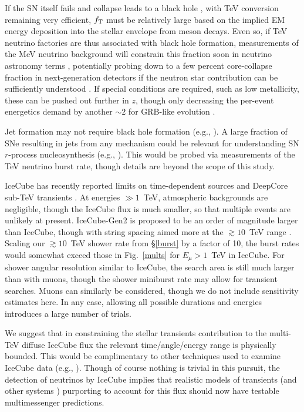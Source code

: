\documentclass[aps,prd,nofootinbib,twocolumn,floatfix,letterpaper,superscriptaddress,showpacs]{revtex4}
\begin{document}
If the SN itself fails and collapse leads to a black hole \cite{Kochanek:2008mp}, with TeV conversion remaining very efficient, $f_{\rm T}$ must be relatively large based on the implied EM energy deposition into the stellar envelope from meson decays.
Even so, if TeV neutrino factories are thus associated with black hole formation, measurements of the MeV neutrino background will constrain this fraction soon in neutrino astronomy terms \cite{Yuksel:2012zy,Lunardini:2009ya,Lien:2010yb,Nakazato:2015rya}, potentially probing down to a few percent core-collapse fraction in next-generation detectors if the neutron star contribution can be sufficiently understood \cite{Yuksel:2012zy}.  If special conditions are required, such as low metallicity, these can be pushed out further in $z$, though only decreasing the per-event energetics demand by another $\sim\! 2$ for GRB-like evolution \cite{Yuksel2007,Kistler2008,Kistler2009b,Kistler2013b}.

Jet formation may not require black hole formation (e.g., \cite{Mosta:2015ucs}).
A large fraction of SNe resulting in jets from any mechanism could be relevant for understanding SN $r$-process nucleosynthesis (e.g., \cite{Cameron,Nomoto:2006ky,Nishimura:2005nz,Winteler:2012hu,Vlasov:2014ara,Qian:2013fsa}).  This would be probed via measurements of the TeV neutrino burst rate, though details are beyond the scope of this study.


IceCube has recently reported limits on time-dependent sources \cite{Aartsen:2015wto} and DeepCore sub-TeV transients \cite{Aartsen:2015pwd}.
At energies $\gg\!1$~TeV, atmospheric backgrounds are negligible, though the IceCube flux is much smaller, so that multiple events are unlikely at present.
IceCube-Gen2 is proposed to be an order of magnitude larger than IceCube, though with string spacing aimed more at the $\gtrsim\!10$~TeV range \cite{Aartsen:2014njl}.  Scaling our $\gtrsim\!10$~TeV shower rate from \S\ref{burst} by a factor of 10, the burst rates would somewhat exceed those in Fig.~\ref{mults} for $E_\mu \!>\! 1$~TeV in IceCube.  For shower angular resolution similar to IceCube, the search area is still much larger than with muons, though the shower miniburst rate may allow for transient searches.  Muons can similarly be considered, though we do not include sensitivity estimates here.
In any case, allowing all possible durations and energies introduces a large number of trials.

We suggest that in constraining the stellar transients contribution to the multi-TeV diffuse IceCube flux the relevant time/angle/energy range is physically bounded.  
This would be complimentary to other techniques used to examine IceCube data (e.g., \cite{Laha2013,Vissani:2013iga,Anchordoqui2014,Winter:2014pya,Chen:2014gxa,Emig:2015dma,Ando2015,Xiao:2016rvd,Vincent:2016nut,Resconi:2016ggj,Biehl:2016psj}).
Though of course nothing is trivial in this pursuit, the detection of neutrinos by IceCube implies that realistic models of transients (and other systems \cite{Kistler20XX}) purporting to account for this flux should now have testable multimessenger predictions.\\
\end{document}
